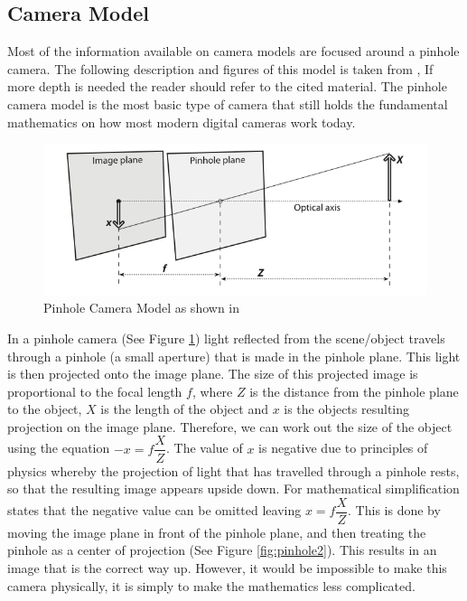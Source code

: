 \documentclass[11pt,oneside]{report}
\begin{document}
				\subsection{Camera Model}
				Most of the information available on camera models are focused around a pinhole camera.
				The following description and figures of this model is taken from , If more depth is needed the reader should refer to the cited material.
				The pinhole camera model is the most basic type of camera that still holds the fundamental mathematics on how most modern digital cameras work today.
				\begin{figure}
				\centering
					\includegraphics[width=\textwidth]{pinhole}
					\caption{Pinhole Camera Model as shown in \protect{} {\label{fig:pinhole}}}

				\end{figure}
				In a pinhole camera (See Figure \ref{fig:pinhole}) light reflected from the scene/object travels through a pinhole (a small aperture) that is made in the pinhole plane.
				This light is then projected onto the image plane.
				The size of this projected image is proportional to the focal length $f$, where $Z$ is the distance from the pinhole plane to the object, $X$ is the length of the object and $x$ is the objects resulting projection on the image plane.
				Therefore, we can work out the size of the object using the equation $-x=f\dfrac{X}{Z}$.
				The value of $x$ is negative due to principles of physics whereby the projection of light that has travelled through a pinhole rests, so that the resulting image appears upside down.
				For mathematical simplification  states that the negative value can be omitted leaving $x=f\dfrac{X}{Z}$.
				This is done by moving the image plane in front of the pinhole plane, and then treating the pinhole as a center of projection (See Figure \ref{fig:pinhole2}).
				This results in an image that is the correct way up. 
				However, it would be impossible to make this camera physically, it is simply to make the mathematics less complicated.
\end{document}

